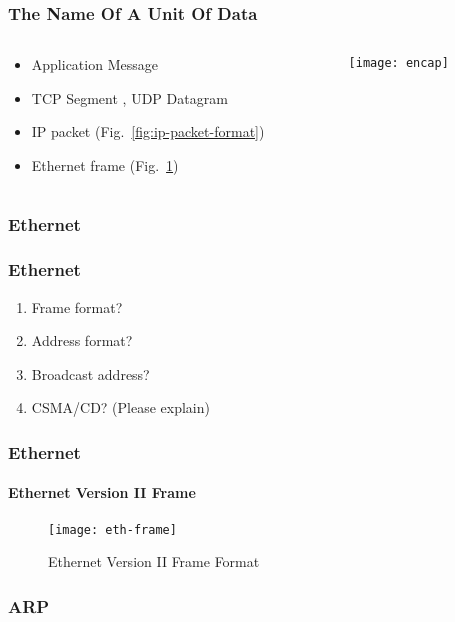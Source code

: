 \documentclass[hyperref={xetex,colorlinks,linkcolor=blue},green,compress]{beamer}
\begin{document}
  \begin{frame}
    \frametitle{The Name Of A Unit Of Data}
    \begin{columns}
      \begin{column}{.5\textwidth}
        \begin{itemize}
        \item Application Message
        \item TCP Segment %
          , UDP
          Datagram %
        \item IP packet (Fig.~\ref{fig:ip-packet-format})
        \item Ethernet frame (Fig.~\ref{fig:ethernet-frame-format})
        \end{itemize}
      \end{column}
      \begin{column}{.5\textwidth}
        \texttt{[image: encap]}
      \end{column}
    \end{columns}
  \end{frame}

  \subsubsection{Ethernet}

  \begin{frame}
    \frametitle{Ethernet}
    \begin{enumerate}
    \item Frame format?
    \item Address format?
    \item Broadcast address?
    \item CSMA/CD? (Please explain)
    \end{enumerate}
  \end{frame}

  \begin{frame}
    \frametitle{Ethernet} \framesubtitle{Ethernet Version II Frame}
    \begin{figure}
      \centering
      \texttt{[image: eth-frame]}
      \caption{Ethernet Version II Frame Format}
      \label{fig:ethernet-frame-format}
    \end{figure}
  \end{frame}


  \subsubsection{ARP}
\end{document}
